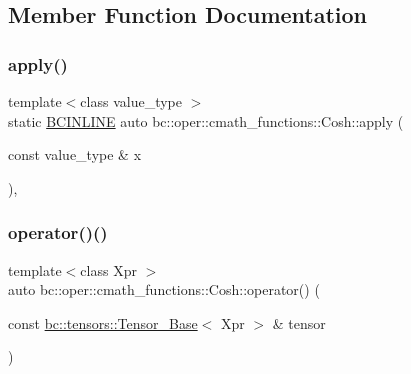 \subsection{Member Function Documentation}
\mbox{\label{structbc_1_1oper_1_1cmath__functions_1_1Cosh_ae815ee9b5af8faa207069f3c8aeff772}} 
\subsubsection{\texorpdfstring{apply()}{apply()}}
{\footnotesize\ttfamily template$<$class value\+\_\+type $>$ \\
static \hyperlink{common_8h_a6699e8b0449da5c0fafb878e59c1d4b1}{B\+C\+I\+N\+L\+I\+NE} auto bc\+::oper\+::cmath\+\_\+functions\+::\+Cosh\+::apply (\begin{DoxyParamCaption}\item[{const value\+\_\+type \&}]{x }\end{DoxyParamCaption})\hspace{0.3cm}{\ttfamily [inline]}, {\ttfamily [static]}}

\mbox{\label{structbc_1_1oper_1_1cmath__functions_1_1Cosh_a066aafb9f888c258f5354b2174d265e9}} 
\subsubsection{\texorpdfstring{operator()()}{operator()()}\hspace{0.1cm}{\footnotesize\ttfamily [1/3]}}
{\footnotesize\ttfamily template$<$class Xpr $>$ \\
auto bc\+::oper\+::cmath\+\_\+functions\+::\+Cosh\+::operator() (\begin{DoxyParamCaption}\item[{const \hyperlink{classbc_1_1tensors_1_1Tensor__Base}{bc\+::tensors\+::\+Tensor\+\_\+\+Base}$<$ Xpr $>$ \&}]{tensor }\end{DoxyParamCaption})\hspace{0.3cm}{\ttfamily [inline]}}

